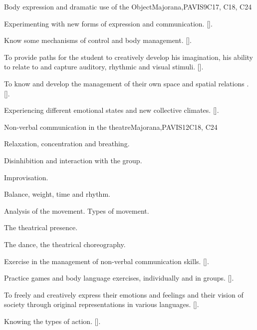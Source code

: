 \begin{syllabus}
\begin{unit}{}{Body expression and dramatic use of the Object}{Majorana,PAVIS}{9}{C17, C18, C24}
\begin{topics}
\end{topics}
\begin{learningoutcomes}
	\item Experimenting with new forms of expression and communication. [\Usage].
	\item Know some mechanisms of control and body management. [\Usage].
	\item To provide paths for the student to creatively develop his imagination, his ability to relate to and capture auditory, rhythmic and visual stimuli. [\Usage].
	\item To know and develop the management of their own space and spatial relations . [\Usage].
	\item Experiencing different emotional states and new collective climates. [\Usage].
\end{learningoutcomes}
\end{unit}

\begin{unit}{}{Non-verbal communication in the theatre}{Majorana,PAVIS}{12}{C18, C24}
\begin{topics}
	\item Relaxation, concentration and breathing.
	\item Disinhibition and interaction with the group.
	\item Improvisation.
	\item Balance, weight, time and rhythm.
	\item Analysis of the movement. Types of movement.
	\item The theatrical presence.
	\item The dance, the theatrical choreography.

\end{topics}
\begin{learningoutcomes}
	\item Exercise in the management of non-verbal communication skills. [\Usage].
	\item Practice games and body language exercises, individually and in groups. [\Usage].
	\item To freely and creatively express their emotions and feelings and their vision of society through original representations in various languages. [\Usage].
	\item Knowing the types of action. [\Usage].
\end{learningoutcomes}
\end{unit}


\end{syllabus}
